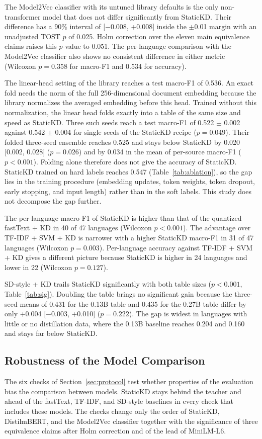 \documentclass{ieeeaccess}
\begin{document}
The Model2Vec classifier with its untuned library defaults is the only non-transformer model that does not differ significantly from StaticKD. Their difference has a 90\% interval of [$-$0.008, +0.008] inside the $\pm$0.01 margin with an unadjusted TOST $p$ of 0.025. Holm correction over the eleven main equivalence claims raises this $p$-value to 0.051. The per-language comparison with the Model2Vec classifier also shows no consistent difference in either metric (Wilcoxon $p=0.358$ for macro-F1 and 0.534 for accuracy).

The linear-head setting of the library reaches a test macro-F1 of 0.536. An exact fold needs the norm of the full 256-dimensional document embedding because the library normalizes the averaged embedding before this head. Trained without this normalization, the linear head folds exactly into a table of the same size and speed as StaticKD. Three such seeds reach a test macro-F1 of 0.522 $\pm$ 0.002 against 0.542 $\pm$ 0.004 for single seeds of the StaticKD recipe ($p=0.049$). Their folded three-seed ensemble reaches 0.525 and stays below StaticKD by 0.020 [0.002, 0.028] ($p=0.026$) and by 0.034 in the mean of per-source macro-F1 ($p<0.001$). Folding alone therefore does not give the accuracy of StaticKD. StaticKD trained on hard labels reaches 0.547 (Table~\ref{tab:ablation}), so the gap lies in the training procedure (embedding updates, token weights, token dropout, early stopping, and input length) rather than in the soft labels. This study does not decompose the gap further.

The per-language macro-F1 of StaticKD is higher than that of the quantized fastText + KD in 40 of 47 languages (Wilcoxon $p<0.001$). The advantage over TF-IDF + SVM + KD is narrower with a higher StaticKD macro-F1 in 31 of 47 languages (Wilcoxon $p=0.003$). Per-language accuracy against TF-IDF + SVM + KD gives a different picture because StaticKD is higher in 24 languages and lower in 22 (Wilcoxon $p=0.127$).

SD-style + KD trails StaticKD significantly with both table sizes ($p<0.001$, Table~\ref{tab:sig}). Doubling the table brings no significant gain because the three-seed means of 0.431 for the 0.13B table and 0.435 for the 0.27B table differ by only +0.004 [$-$0.003, +0.010] ($p=0.222$). The gap is widest in languages with little or no distillation data, where the 0.13B baseline reaches 0.204 and 0.160 and stays far below StaticKD.

\subsection{Robustness of the Model Comparison}
\label{sec:res-robust}
The six checks of Section~\ref{sec:protocol} test whether properties of the evaluation bias the comparison between models. StaticKD stays behind the teacher and ahead of the fastText, TF-IDF, and SD-style baselines in every check that includes these models. The checks change only the order of StaticKD, DistilmBERT, and the Model2Vec classifier together with the significance of three equivalence claims after Holm correction and of the lead of MiniLM-L6.
\end{document}

